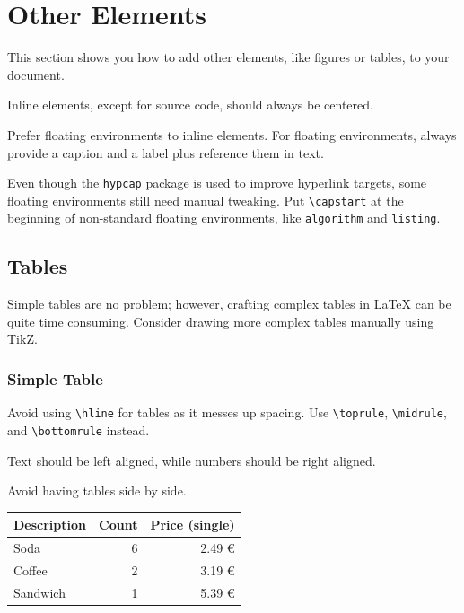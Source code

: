 \chapter{Other Elements}
\label{chp:other_elements}

This section shows you how to add other elements, like figures or tables, to your document.

Inline elements, except for source code, should always be centered.

Prefer floating environments to inline elements.
For floating environments, always provide a caption and a label plus reference them in text.

Even though the \texttt{hypcap} package is used to improve hyperlink targets, some floating environments still need manual tweaking.
Put \texttt{\textbackslash{}capstart} at the beginning of non-standard floating environments, like \texttt{algorithm} and \texttt{listing}.

\section{Tables}

Simple tables are no problem; however, crafting complex tables in \LaTeX{} can be quite time consuming.
Consider drawing more complex tables manually using TikZ.

\subsection{Simple Table}

Avoid using \texttt{\textbackslash{}hline} for tables as it messes up spacing.
Use \texttt{\textbackslash{}toprule}, \texttt{\textbackslash{}midrule}, and \texttt{\textbackslash{}bottomrule} instead.

Text should be left aligned, while numbers should be right aligned.

Avoid having tables side by side.

\begin{center}
\begin{tabular}{lrr}
	\toprule
	Description & Count & Price (single)\\
	\midrule
	Soda & 6 & 2.49 €\\
	Coffee & 2 & 3.19 €\\
	Sandwich & 1 & 5.39 €\\
	\bottomrule
\end{tabular}
\end{center}

